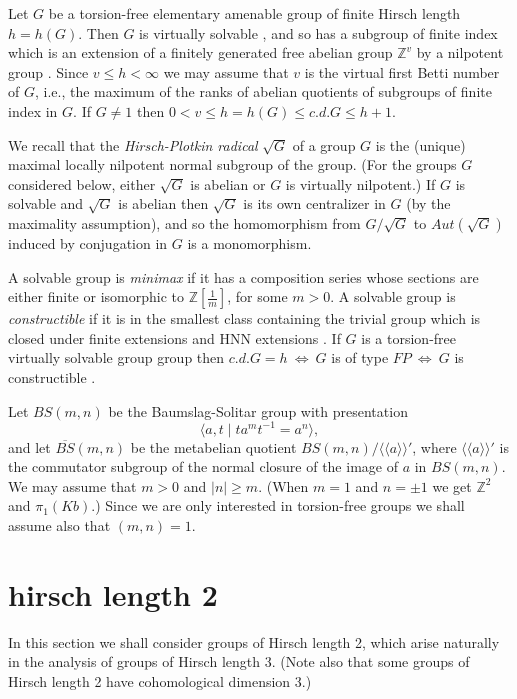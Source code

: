 \documentclass[12pt]{amsart}
\renewcommand{\geq}{\geqslant}
\renewcommand{\leq}{\leqslant}
\begin{document}
Let $G$ be a torsion-free elementary amenable group of finite Hirsch length 
$h=h(G)$.
Then $G$ is virtually solvable \cite{HL92},
and so has a subgroup of finite index which is an extension of a finitely generated free abelian group $\mathbb{Z}^v$ by a nilpotent group  \cite{Ca60}.
Since $v\leq{h}<\infty$ we may assume that $v$ is the virtual first Betti number 
of $G$,
i.e., the maximum of the ranks of abelian quotients of 
subgroups of finite index in $G$. 
If $G\not=1$ then $0<v\leq{h}=h(G)\leq{c.d.G}\leq{h+1}$.

We recall that the {\it Hirsch-Plotkin radical} $\sqrt{G}$ of a group $G$
is the (unique) maximal locally nilpotent normal subgroup of the group. 
(For the groups $G$ considered below, 
either $\sqrt{G}$ is abelian or $G$ is virtually nilpotent.)
If $G$ is solvable and $\sqrt{G}$ is abelian then $\sqrt{G}$ 
is its own centralizer in $G$ (by the maximality assumption),
and so the homomorphism from $G/\sqrt{G}$ to $Aut(\sqrt{G})$
induced by conjugation in $G$ is a monomorphism.

A solvable group is {\it minimax\/} if it has a composition series whose sections are either finite or isomorphic to $\mathbb{Z}[\frac1m]$, for some $m>0$.
A  solvable group is {\it constructible\/} if it is in the smallest class containing 
the trivial group which is closed under finite extensions and HNN extensions \cite{BB76}.
If $G$ is a torsion-free virtually solvable group group then
$c.d.G=h~\Leftrightarrow~G$ is of type $FP~\Leftrightarrow~G$ 
is constructible \cite{Kr86}.

Let $BS(m,n)$ be the Baumslag-Solitar group 
with presentation 
\[
\langle{a,t}\mid {ta^mt^{-1}=a^n}\rangle,
\]
and let $\overline{BS}(m,n)$ be the metabelian quotient
$BS(m,n)/\langle\langle{a}\rangle\rangle'$,
where $\langle\langle{a}\rangle\rangle'$ is
the commutator subgroup of the normal closure of the image of $a$
in $BS(m,n)$.
We may assume that $m>0$ and $|n|\geq{m}$.
(When $m=1$ and $n=\pm1$ we get $\mathbb{Z}^2$ and $\pi_1(Kb)$.)
Since we are only interested in torsion-free groups we shall assume also
that $(m,n)=1$.

\section{ hirsch length 2}

In this section we shall consider groups of Hirsch length 2,
which arise naturally in the analysis of groups of Hirsch length 3.
(Note also that some groups of Hirsch length 2
have cohomological dimension 3.)
\end{document}

